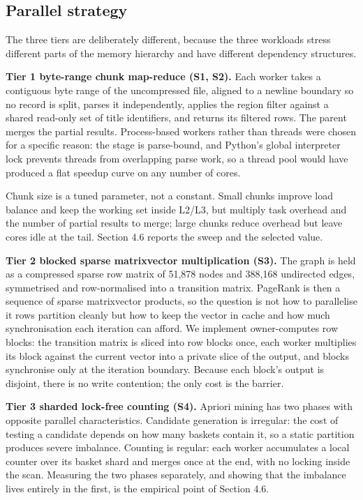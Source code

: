 \subsection{Parallel strategy}

The three tiers are deliberately different, because the three workloads stress different parts of the memory hierarchy and have different dependency structures.

\textbf{Tier 1 \textemdash{} byte-range chunk map-reduce (S1, S2).} Each worker takes a contiguous byte range of the uncompressed file, aligned to a newline boundary so no record is split, parses it independently, applies the region filter against a shared read-only set of title identifiers, and returns its filtered rows. The parent merges the partial results. Process-based workers rather than threads were chosen for a specific reason: the stage is parse-bound, and Python's global interpreter lock prevents threads from overlapping parse work, so a thread pool would have produced a flat speedup curve on any number of cores.

Chunk size is a tuned parameter, not a constant. Small chunks improve load balance and keep the working set inside L2/L3, but multiply task overhead and the number of partial results to merge; large chunks reduce overhead but leave cores idle at the tail. Section 4.6 reports the sweep and the selected value.

\textbf{Tier 2 \textemdash{} blocked sparse matrix\textendash{}vector multiplication (S3).} The graph is held as a compressed sparse row matrix of 51,878 nodes and 388,168 undirected edges, symmetrised and row-normalised into a transition matrix. PageRank is then a sequence of sparse matrix\textendash{}vector products, so the question is not how to parallelise it \textemdash{} rows partition cleanly \textemdash{} but how to keep the vector in cache and how much synchronisation each iteration can afford. We implement owner-computes row blocks: the transition matrix is sliced into row blocks once, each worker multiplies its block against the current vector into a private slice of the output, and blocks synchronise only at the iteration boundary. Because each block's output is disjoint, there is no write contention; the only cost is the barrier.

\textbf{Tier 3 \textemdash{} sharded lock-free counting (S4).} Apriori mining has two phases with opposite parallel characteristics. Candidate generation is irregular: the cost of testing a candidate depends on how many baskets contain it, so a static partition produces severe imbalance. Counting is regular: each worker accumulates a local counter over its basket shard and merges once at the end, with no locking inside the scan. Measuring the two phases separately, and showing that the imbalance lives entirely in the first, is the empirical point of Section 4.6.

